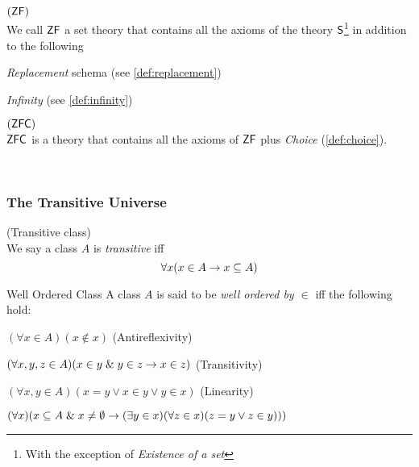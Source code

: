 \begin{definition}{$(\sf{ZF})$}\label{def:zf}\\
We call $\sf{ZF}$ a set theory that contains all the axioms of the theory $\sf{S}$\footnote{With the exception of \emph{Existence of a set}} in addition to the following
\bce[(i)]
\item \emph{Replacement} schema (see \ref{def:replacement})
\item \emph{Infinity} (see \ref{def:infinity})
\ece
\end{definition}

\begin{definition}{$(\sf{ZFC})$}\label{def:zfc}\\
$\sf{ZFC}$ is a theory that contains all the axioms of $\sf{ZF}$ plus \emph{Choice} (\ref{def:choice}).
\end{definition}

\

\subsubsection{The Transitive Universe}
\begin{definition}{(Transitive class)}\label{def:transitivity}\\
We say a class $A$ is \emph{transitive} iff
\begin{equation}
\forall x(x \in A \rightarrow x \subseteq A)
\end{equation}
\end{definition}

\begin{definition}{Well Ordered Class}\label{def:well_ordering}
A class $A$ is said to be \emph{well ordered by $\in$} iff the following hold:
\bce[(i)]
\item $(\forall x \in A)(x \not\in x)$ (Antireflexivity)
\item $(\forall x, y, z \in A)(x \in y \mathrel{\&} y \in z \rightarrow x \in z)$ (Transitivity)
\item $(\forall x, y \in A)(x = y \lor x \in y \lor y \in x)$ (Linearity)
\item $(\forall x)(x \subseteq A \mathrel{\&} x \neq \emptyset \rightarrow (\exists y \in x)(\forall z \in x)(z = y \lor z \in y)))$ %
\ece
\end{definition}

